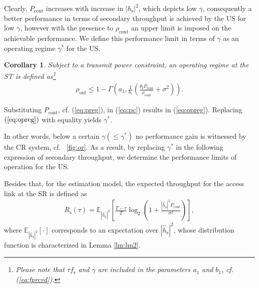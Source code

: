 \documentclass[letterpaper, twocolumn]{IEEEtran}
\newcommand{\e}[2]{{\mathbb E}_{#1}\left[ #2 \right]}
\newcommand{\sub}[1]{_{\text{#1}}}
\newcommand{\opc}{\rho\sub{out}}
\newcommand{\pc}{\rho\sub{cont}}
\newcommand{\preg}{P\sub{cont}}
\newcommand{\ptran}{P\sub{tran}}
\newcommand{\ite}{\theta\sub{I}}
\newcommand{\rs}{R\sub{s}}
\newcommand{\epgs}{|\hat{h}\sub{s}|^2}
\newcommand{\pgs}{|h\sub{s}|^2}
\newcommand{\nps}{\sigma^2}
\newcommand{\fsam}{f\sub{s}}
\newtheorem{coro}{Corollary}
\begin{document}
Clearly, $\preg$ increases with increase in $\pgs$, which depicts low $\gamma$, consequently a better performance in terms of secondary throughput is achieved by the US for low $\gamma$, however with the presence to $\pc$ an upper limit is imposed on the achievable performance. We define this performance limit in terms of $\gamma$ as an operating regime $\gamma^*$ for the US. 
\begin{coro}
Subject to a transmit power constraint, an operating regime at the ST is defined as\footnote{Please note that $\tau \fsam$ and $\gamma$ are included in the parameters $a_1$ and $b_1$, cf. (\ref{eq:fprcvd}).} 
\begin{align}
\opc \le 1 - \Gamma\left(a_1, \frac{1}{b_1} \left( \frac{\ite \ptran}{\pc} + \nps  \right)  \right). \label{eq:opreg}  
\end{align}
\end{coro}
\begin{IEEEproof}
Substituting $\preg$, cf. (\ref{eq:preg}), in (\ref{eq:pc}) results in (\ref{eq:opreg}). Replacing $(\ref{eq:opreg})$ with equality yields $\gamma^*$. 
\end{IEEEproof}
In other words, below a certain $\gamma (\le \gamma^{*})$ no performance gain is witnessed by the CR system, cf. \figurename~\ref{fig:or}. As a result, by replacing $\gamma^*$ in the following expression of secondary throughput, we determine the performance limits of operation for the US. 
 
Besides that, for the estimation model, the expected throughput for the access link at the SR is defined as
\begin{align}
\rs(\tau) = \e{\epgs} {\frac{T - \tau}{T} \log_2 \left(1 + \frac{\epgs \preg }{\nps} \right)}, \label{eq:rs}
\end{align} 
where $\e{\epgs}{\cdot}$ corresponds to an expectation over $\epgs$, whose distribution function is characterized in Lemma \ref{lm:lm2}. 
\end{document}
